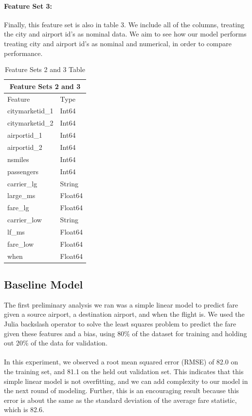 \documentclass{article}
\begin{document}
\paragraph{Feature Set 3:} Finally, this feature set is also in table 3. We include all of the columns, treating the city and airport id's as nominal data. We aim to see how our model performs treating city and airport id's as nominal and numerical, in order to compare performance. 
\begin{table}[h!]
\centering
\begin{tabular}{ |p{3cm}||p{3cm}|  }
 \hline
 \multicolumn{2}{|c|}{Feature Sets 2 and 3} \\
 \hline Feature & Type\\
 \hline
 citymarketid\_1 & Int64\\
 citymarketid\_2 & Int64\\
airportid\_1 & Int64\\
airportid\_2 & Int64\\
nsmiles & Int64\\
passengers & Int64 \\
carrier\_lg & String\\
large\_ms & Float64 \\
fare\_lg & Float64\\
carrier\_low & String\\
lf\_ms & Float64\\
fare\_low & Float64\\
when & Float64\\
 \hline
\end{tabular}
\caption{Feature Sets 2 and 3 Table}
\label{table:1}
\end{table}
\subsection{Baseline Model}
The first preliminary analysis we ran was a simple linear model to predict fare given a source airport, a destination airport, and when the flight is. We used the Julia backslash operator to solve the least squares problem to predict the fare given these features and a bias, using 80\% of the dataset for training and holding out 20\% of the data for validation.\\\\
In this experiment, we observed a root mean squared error (RMSE) of 82.0 on the training set, and 81.1 on the held out validation set. This indicates that this simple linear model is not overfitting, and we can add complexity to our model in the next round of modeling. Further, this is an encouraging result because this error is about the same as the standard deviation of the average fare statistic, which is 82.6. 
\end{document}
